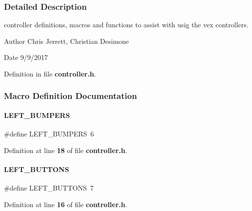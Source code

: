\subsubsection{Detailed Description}
controller definitions, macros and functions to assist with usig the vex controllers. 

\begin{DoxyAuthor}{Author}
Chris Jerrett, Christian Desimone 
\end{DoxyAuthor}
\begin{DoxyDate}{Date}
9/9/2017 
\end{DoxyDate}


Definition in file \textbf{ controller.\+h}.



\subsubsection{Macro Definition Documentation}
\mbox{\label{controller_8h_ad61eb6d28a76985afb8d39ef925541bb}} 
\paragraph{L\+E\+F\+T\+\_\+\+B\+U\+M\+P\+E\+RS}
{\footnotesize\ttfamily \#define L\+E\+F\+T\+\_\+\+B\+U\+M\+P\+E\+RS~6}



Definition at line \textbf{ 18} of file \textbf{ controller.\+h}.

\mbox{\label{controller_8h_a9b885de9f143efd0c862ceb054256536}} 
\paragraph{L\+E\+F\+T\+\_\+\+B\+U\+T\+T\+O\+NS}
{\footnotesize\ttfamily \#define L\+E\+F\+T\+\_\+\+B\+U\+T\+T\+O\+NS~7}



Definition at line \textbf{ 16} of file \textbf{ controller.\+h}.

\mbox{\label{controller_8h_ac055a23829dc64aa20b8e2e1bcfbf316}} 
